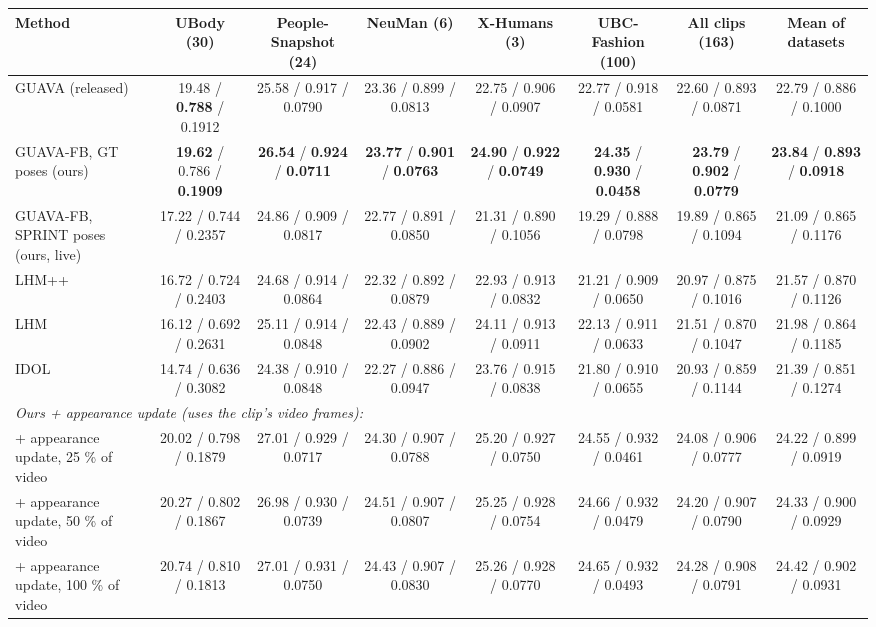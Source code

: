 \begin{tabular}{lccccccc}
\toprule
Method & UBody (30) & People-Snapshot (24) & NeuMan (6) & X-Humans (3) & UBC-Fashion (100) & All clips (163) & Mean of datasets \\
\midrule
GUAVA (released) & 19.48 / \textbf{0.788} / 0.1912 & 25.58 / 0.917 / 0.0790 & 23.36 / 0.899 / 0.0813 & 22.75 / 0.906 / 0.0907 & 22.77 / 0.918 / 0.0581 & 22.60 / 0.893 / 0.0871 & 22.79 / 0.886 / 0.1000 \\
GUAVA-FB, GT poses (ours) & \textbf{19.62} / 0.786 / \textbf{0.1909} & \textbf{26.54} / \textbf{0.924} / \textbf{0.0711} & \textbf{23.77} / \textbf{0.901} / \textbf{0.0763} & \textbf{24.90} / \textbf{0.922} / \textbf{0.0749} & \textbf{24.35} / \textbf{0.930} / \textbf{0.0458} & \textbf{23.79} / \textbf{0.902} / \textbf{0.0779} & \textbf{23.84} / \textbf{0.893} / \textbf{0.0918} \\
GUAVA-FB, SPRINT poses (ours, live) & 17.22 / 0.744 / 0.2357 & 24.86 / 0.909 / 0.0817 & 22.77 / 0.891 / 0.0850 & 21.31 / 0.890 / 0.1056 & 19.29 / 0.888 / 0.0798 & 19.89 / 0.865 / 0.1094 & 21.09 / 0.865 / 0.1176 \\
LHM++ & 16.72 / 0.724 / 0.2403 & 24.68 / 0.914 / 0.0864 & 22.32 / 0.892 / 0.0879 & 22.93 / 0.913 / 0.0832 & 21.21 / 0.909 / 0.0650 & 20.97 / 0.875 / 0.1016 & 21.57 / 0.870 / 0.1126 \\
LHM & 16.12 / 0.692 / 0.2631 & 25.11 / 0.914 / 0.0848 & 22.43 / 0.889 / 0.0902 & 24.11 / 0.913 / 0.0911 & 22.13 / 0.911 / 0.0633 & 21.51 / 0.870 / 0.1047 & 21.98 / 0.864 / 0.1185 \\
IDOL & 14.74 / 0.636 / 0.3082 & 24.38 / 0.910 / 0.0848 & 22.27 / 0.886 / 0.0947 & 23.76 / 0.915 / 0.0838 & 21.80 / 0.910 / 0.0655 & 20.93 / 0.859 / 0.1144 & 21.39 / 0.851 / 0.1274 \\
\midrule
\multicolumn{8}{l}{\textit{Ours + appearance update (uses the clip's video frames):}} \\
+ appearance update, 25 \% of video & 20.02 / 0.798 / 0.1879 & 27.01 / 0.929 / 0.0717 & 24.30 / 0.907 / 0.0788 & 25.20 / 0.927 / 0.0750 & 24.55 / 0.932 / 0.0461 & 24.08 / 0.906 / 0.0777 & 24.22 / 0.899 / 0.0919 \\
+ appearance update, 50 \% of video & 20.27 / 0.802 / 0.1867 & 26.98 / 0.930 / 0.0739 & 24.51 / 0.907 / 0.0807 & 25.25 / 0.928 / 0.0754 & 24.66 / 0.932 / 0.0479 & 24.20 / 0.907 / 0.0790 & 24.33 / 0.900 / 0.0929 \\
+ appearance update, 100 \% of video & 20.74 / 0.810 / 0.1813 & 27.01 / 0.931 / 0.0750 & 24.43 / 0.907 / 0.0830 & 25.26 / 0.928 / 0.0770 & 24.65 / 0.932 / 0.0493 & 24.28 / 0.908 / 0.0791 & 24.42 / 0.902 / 0.0931 \\

\end{tabular}
